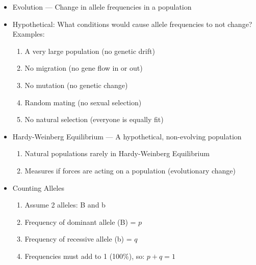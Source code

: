 \documentclass[12pt]{article}
\begin{document}
\begin{itemize}
\begin{itemize}
    \end{itemize}
    
  \item Evolution — Change in allele frequencies in a population

  \item Hypothetical: What conditions would cause allele frequencies to not change? Examples:

    \begin{enumerate}

      \item A very large population (no genetic drift)

      \item No migration (no gene flow in or out)

      \item No mutation (no genetic change)

      \item Random mating (no sexual selection)

      \item No natural selection (everyone is equally fit)

    \end{enumerate}

  \item Hardy-Weinberg Equilibrium — A hypothetical, non-evolving population

    \begin{enumerate}

      \item Natural populations rarely in Hardy-Weinberg Equilibrium

      \item Measures if forces are acting on a population (evolutionary change)

    \end{enumerate}

  \item Counting Alleles

    \begin{enumerate}

      \item Assume 2 alleles: B and b

      \item Frequency of dominant allele (B) = $p$

      \item Frequency of recessive allele (b) = $q$

      \item Frequencies must add to 1 (100\%), so: $p+q=1$


\end{enumerate}
\end{itemize}
\end{document}

